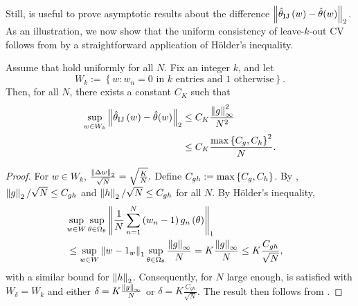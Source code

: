 Still,  is useful to prove asymptotic
results about the difference $\left\Vert \hat{\theta}_{\textrm{IJ}}\left(w\right)-{\hat{\theta}(w)}\right\Vert_{2}$.
As an illustration, we now show that the uniform consistency of leave-$k$-out
CV follows from  by a straightforward
application of H{\"o}lder's inequality.
%
\begin{cor}
\label{cor:paper_k_means_consistent}
Assume that \paperallcoreassum hold uniformly for all $N$. Fix an integer
$k$, and let
%
$$
W_{k}:=\left\{ w:w_{n}=0\textrm{ in }k\textrm{ entries and }1\textrm{ otherwise}\right\} .
$$
%
Then, for all $N$, there exists a constant $C_K$ such that
\begin{align*}
\sup_{w\in W_{k}}\left\Vert \hat{\theta}_{\textrm{IJ}}\left(w\right)-{\hat{\theta}(w)}\right\Vert_{2}
    & \le C_K \frac{\left\Vert g\right\Vert_{\infty}^2}{N^2} \\
    & \le C_K \frac{\max\left\{C_{g}, C_{h}\right\}^2}{N}.
\end{align*}
\end{cor}
%
\begin{proof}
For $w\in W_{k}$, $\frac{\left\Vert \Delta w\right\Vert_{2}}{\sqrt{N}}=\sqrt{\frac{K}{N}}.$
Define $C_{gh} := \max\left\{C_{g}, C_{h}\right\}$.
By ,
$\left\Vert g\right\Vert_{2}/\sqrt{N}\le C_{gh}$ and $\left\Vert h\right\Vert_{2}/\sqrt{N}\le C_{gh}$
for all $N$. By H{\"o}lder's inequality,
\begin{align*}
\lefteqn{ \sup_{w\in W}\sup_{\theta\in\Omega_{\theta}}
    \norm{\frac{1}{N}\sum_{n=1}^{N}\left(w_{n}-1\right)g_{n}
        \left(\theta\right)}_{1} } \\
    & \le \sup_{w\in W} \norm{w - \onevec}_1
    	\sup_{\theta\in\Omega_{\theta}} \frac{\norm g_{\infty}}{N}
    =
    	K \frac{\norm g_{\infty}}{N} \le
    	K \frac{C_{gh}}{\sqrt{N}},
\end{align*}
with a similar bound for $\left\Vert h\right\Vert_{2}$. Consequently, for $N$ large
enough,  is satisfied with $W_{\delta}=W_{k}$
and either $\delta=K \frac{\left\Vert g\right\Vert_{\infty}}{N}$
or $\delta=K \frac{C_{gh}}{\sqrt{N}}$.
The result then follows from .
\end{proof}
